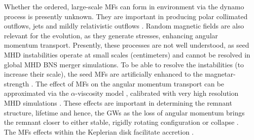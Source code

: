 Whether the ordered, large-scale \acp{MF} can form in \pmerg{} environment 
via the dynamo process is presently unknown. They are important in producing 
polar collimated outflows, jets \citep{Bucciantini:2011kx,Ruiz:2016rai} and mildly relativistic 
outflows \citep{Metzger:2018qfl,Fernandez:2018kax}. Random magnetic fields are also 
relevant for the \pmerg{} evolution, as they generate stresses, enhancing angular momentum transport. 
Presently, these processes are not well understood, as seed \ac{MHD} instabilities operate at 
small scales (centimeters) and cannot be resolved in global \ac{MHD} \ac{BNS} merger 
simulations.
To be able to resolve the instabilities (to increase their scale), the seed \acp{MF} are 
artificially enhanced to the magnetar-strength \citep{Kiuchi:2015sga,Kiuchi:2017zzg}.
%
The effect of \acp{MF} on the angular momentum transport can be approximated via 
the $\alpha$-viscosity model \citep{Shakura:1972te}, calibrated 
with very high resolution \ac{MHD} simulations \citep{Radice:2017zta,Radice:2020ids}. 
These effects are important 
in determining the remnant structure, lifetime and hence, the \pmerg{} \acp{GW} 
\citep{Radice:2017zta,Shibata:2017xht} 
as the loss of angular momentum brings the remnant closer to either stable, 
rigidly rotating configuration or collapse \citep{Hotokezaka:2013iia}. 
%
The \acp{MF} effects within the Keplerian disk facilitate accretion 
\citep{Fernandez:2015use,Fujibayashi:2017puw,Fernandez:2018kax,Miller:2019dpt}.

